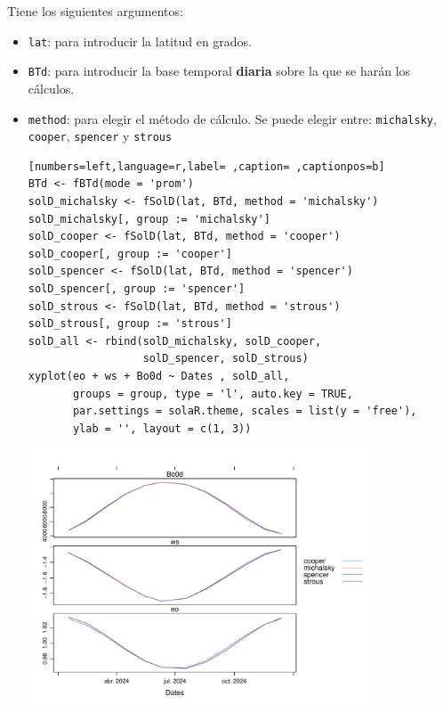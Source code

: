 Tiene los siguientes argumentos:
\begin{itemize}
\item \texttt{lat}: para introducir la latitud en grados.
\item \texttt{BTd}: para introducir la base temporal \textbf{diaria} sobre la que se harán los cálculos.
\item \texttt{method}: para elegir el método de cálculo. Se puede elegir entre: \texttt{michalsky}, \texttt{cooper}, \texttt{spencer} y \texttt{strous}
\begin{lstlisting}[numbers=left,language=r,label= ,caption= ,captionpos=b]
BTd <- fBTd(mode = 'prom')
solD_michalsky <- fSolD(lat, BTd, method = 'michalsky')
solD_michalsky[, group := 'michalsky']
solD_cooper <- fSolD(lat, BTd, method = 'cooper')
solD_cooper[, group := 'cooper']
solD_spencer <- fSolD(lat, BTd, method = 'spencer')
solD_spencer[, group := 'spencer']
solD_strous <- fSolD(lat, BTd, method = 'strous')
solD_strous[, group := 'strous']
solD_all <- rbind(solD_michalsky, solD_cooper,
                  solD_spencer, solD_strous)
xyplot(eo + ws + Bo0d ~ Dates , solD_all,
       groups = group, type = 'l', auto.key = TRUE,
       par.settings = solaR.theme, scales = list(y = 'free'),
       ylab = '', layout = c(1, 3))
\end{lstlisting}

\begin{center}
\includegraphics[width=0.8\textwidth]{figuras/codigo-fSolD.pdf}
\end{center}
\end{itemize}
